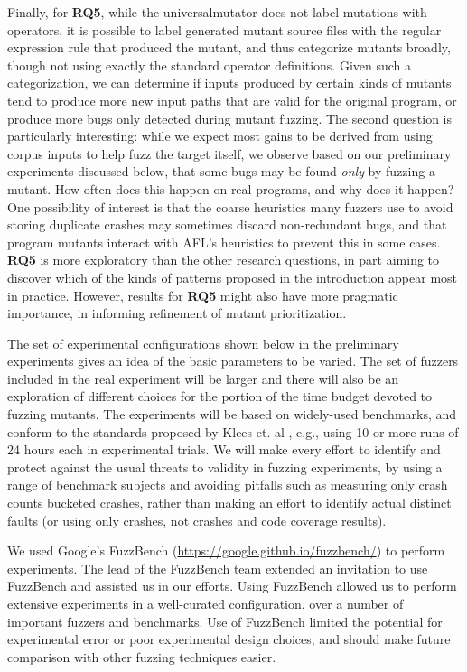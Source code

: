 Finally, for {\bf RQ5}, while the universalmutator does not label mutations with operators, it is possible to label generated mutant source files with the regular expression rule that produced the mutant, and thus categorize mutants broadly, though not using exactly the standard operator definitions.  Given such a categorization, we can determine if inputs produced by certain kinds of mutants tend to produce more new input paths that are valid for the original program, or produce more bugs only detected during mutant fuzzing.  The second question is particularly interesting: while we expect most gains to be derived from using corpus
inputs to help fuzz the target itself, we observe based on our
preliminary experiments discussed below, that some bugs may be found
\emph{only} by fuzzing a mutant.  How often does this happen on real
programs, and why does it happen?  One possibility of interest is that the coarse heuristics many fuzzers use to avoid storing duplicate crashes \cite{semantic-crash-bucketing,mdebug} may sometimes discard non-redundant bugs, and that program mutants interact with AFL's heuristics to prevent this in some cases.  {\bf RQ5} is more exploratory than the other research questions, in part aiming to discover which of the kinds of patterns proposed in the introduction appear most in practice.  However, results for {\bf RQ5} might also have more pragmatic importance, in informing refinement of mutant prioritization.

The set of experimental configurations shown below in the preliminary experiments gives an idea of the basic parameters to be varied.  The set of fuzzers included in the real experiment will be larger and there will also be an exploration of different choices for the portion of the time budget devoted to fuzzing mutants.  The experiments will be based on widely-used benchmarks, and conform to the standards proposed by Klees et. al \cite{evalfuzz}, e.g., using 10 or
more runs of 24 hours each in experimental trials.  We will make every effort to identify and protect against the usual threats to validity in fuzzing experiments, by using a range of benchmark subjects and avoiding pitfalls such as measuring only crash counts bucketed crashes, rather than making an effort to identify actual distinct faults \cite{FuzzAppeal} (or using only crashes, not crashes and code coverage results).

We  used Google's FuzzBench \cite{metzman2021fuzzbench} (\url{https://google.github.io/fuzzbench/}) to perform experiments.  The lead of the FuzzBench team extended an invitation to use FuzzBench and assisted us in our efforts.  Using FuzzBench allowed us to perform extensive experiments in a well-curated configuration, over a number of important fuzzers and benchmarks.  Use of FuzzBench limited the potential for experimental error or poor experimental design choices, and should make future comparison with other fuzzing techniques easier.

